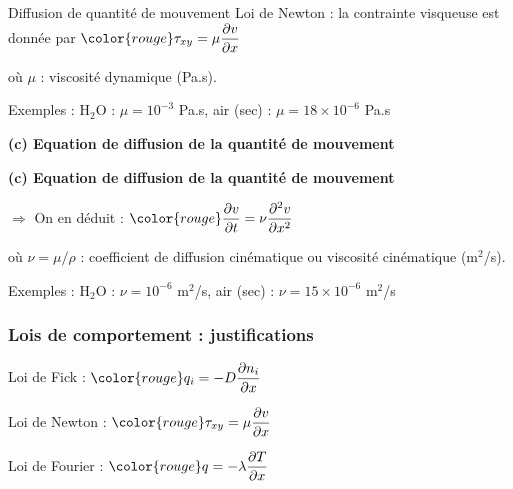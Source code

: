 {\begin{frame}{Diffusion de quantité de mouvement}
Loi de Newton : la contrainte visqueuse est donnée par \qquad
$
	\color{rouge} \tau_{xy} = \mu \dpdx{v}
$

\begin{overprint}

o\`u $\mu$ : viscosité dynamique (Pa.s).

\smallskip
Exemples : H$_2$O : $\mu=10^{-3}$ Pa.s, \quad air (sec) : $\mu=18 \times 10^{-6}$ Pa.s


\medskip

\textbf{(c) Equation de diffusion de la quantité de mouvement} \medskip


\medskip

\textbf{(c) Equation de diffusion de la quantité de mouvement} \smallskip

\hspace{40mm} $\Rightarrow$ On en déduit : \qquad $\color{rouge} \dpdt{v} = \nu \ddpdx{v}$

\medskip

o\`u $\nu = \mu/\rho$ : coefficient de diffusion cinématique ou viscosité cinématique (m$^2$/s).

\smallskip
Exemples : H$_2$O : $\nu=10^{-6}$ m$^2$/s, \quad air (sec) : $\nu=15 \times 10^{-6}$ m$^2$/s

\end{overprint}

\vspace{1mm}

\end{frame}



\subsubsection{Lois de comportement : justifications}

\begin{frame}{\insertsubsubsectionhead}



\pause

Loi de Fick :  \qquad $	\color{rouge}  q_i = -D \dpdx{n_i}$
\medskip

Loi de Newton : \qquad  $\color{rouge} \tau_{xy} = \mu \dpdx{v}$

\medskip

Loi de Fourier : \qquad $\color{rouge}	q = -\lambda \dpdx{T}$


\end{frame}}
